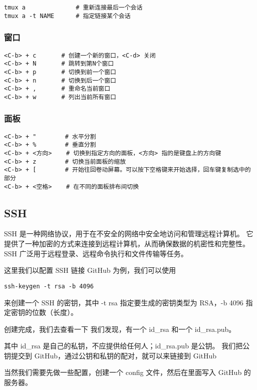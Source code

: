         \begin{verbatim}
tmux a              # 重新连接最后一个会话
tmux a -t NAME      # 指定链接某个会话
        \end{verbatim}

    \subsubsection{窗口}
        \begin{verbatim}
<C-b> + c       # 创建一个新的窗口，<C-d> 关闭
<C-b> + N       # 跳转到第N个窗口
<C-b> + p       # 切换到前一个窗口
<C-b> + n       # 切换到后一个窗口
<C-b> + ,       # 重命名当前窗口
<C-b> + w       # 列出当前所有窗口
        \end{verbatim}

    \subsubsection{面板}

        \begin{verbatim}
<C-b> + "        # 水平分割
<C-b> + %        # 垂直分割
<C-b> + <方向>    # 切换到指定方向的面板，<方向> 指的是键盘上的方向键
<C-b> + z        # 切换当前面板的缩放
<C-b> + [        # 开始往回卷动屏幕。可以按下空格键来开始选择，回车键复制选中的部分
<C-b> + <空格>    # 在不同的面板排布间切换
        \end{verbatim}

\subsection{SSH}\label{subsec:ssh}
    SSH 是一种网络协议，用于在不安全的网络中安全地访问和管理远程计算机。
    它提供了一种加密的方式来连接到远程计算机，从而确保数据的机密性和完整性。
    SSH 广泛用于远程登录、远程命令执行和文件传输等任务。

    这里我们以配置 SSH 链接 GitHub 为例，我们可以使用
    \begin{verbatim}
ssh-keygen -t rsa -b 4096
    \end{verbatim}
    来创建一个 SSH 的密钥，其中 -t rsa 指定要生成的密钥类型为 RSA，-b 4096 指定密钥的位数（长度）。

    创建完成，我们去查看一下
    我们发现，有一个 id\_rsa 和一个 id\_rsa.pub。

    其中 id\_rsa 是自己的私钥，不应提供给任何人；id\_rsa.pub 是公钥。
    我们把公钥提交到 GitHub，通过公钥和私钥的配对，就可以来链接到 GitHub

    当然我们需要先做一些配置，创建一个 config 文件，然后在里面写入 GitHub 的服务器。
